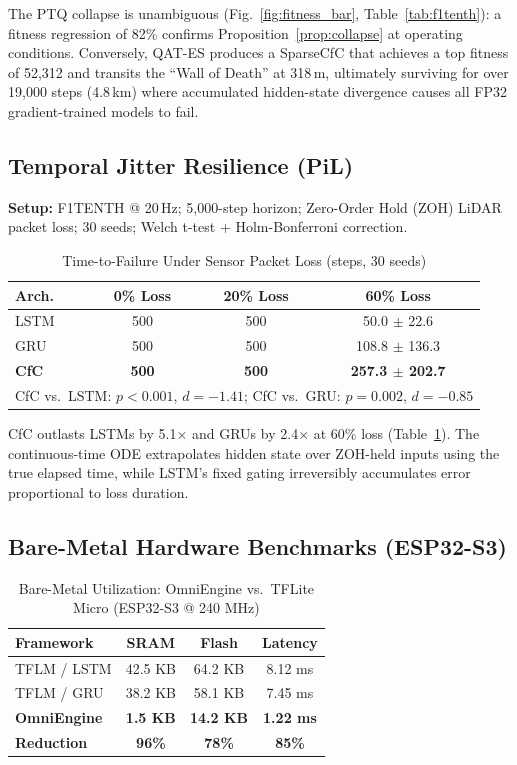 \documentclass[lettersize,journal]{IEEEtran}
\begin{document}
The PTQ collapse is unambiguous (Fig.~\ref{fig:fitness_bar}, Table~\ref{tab:f1tenth}): a fitness regression of 82\% confirms Proposition~\ref{prop:collapse} at operating conditions. Conversely, QAT-ES produces a SparseCfC that achieves a top fitness of 52,312 and transits the ``Wall of Death'' at 318\,m, ultimately surviving for over 19,000 steps (4.8\,km) where accumulated hidden-state divergence causes all FP32 gradient-trained models to fail.

\subsection{Temporal Jitter Resilience (PiL)}
\textbf{Setup:} F1TENTH @ 20\,Hz; 5,000-step horizon; Zero-Order Hold (ZOH) LiDAR packet loss; 30 seeds; Welch t-test + Holm-Bonferroni correction.

\begin{table}[!t]
\caption{Time-to-Failure Under Sensor Packet Loss (steps, 30 seeds)}
\centering
\footnotesize
\begin{tabular}{@{}l c c c@{}}
\toprule
\textbf{Arch.} & \textbf{0\% Loss} & \textbf{20\% Loss} & \textbf{60\% Loss} \\
\midrule
LSTM & 500 & 500 & 50.0 $\pm$ 22.6 \\
GRU  & 500 & 500 & 108.8 $\pm$ 136.3 \\
\textbf{CfC} & \textbf{500} & \textbf{500} & \textbf{257.3 $\pm$ 202.7} \\
\midrule
\multicolumn{4}{l}{\footnotesize CfC vs.\ LSTM: $p{<}0.001$, $d{=}{-}1.41$; CfC vs.\ GRU: $p{=}0.002$, $d{=}{-}0.85$}
\end{tabular}
\label{tab:jitter}
\end{table}

CfC outlasts LSTMs by 5.1$\times$ and GRUs by 2.4$\times$ at 60\% loss (Table~\ref{tab:jitter}). The continuous-time ODE extrapolates hidden state over ZOH-held inputs using the true elapsed time, while LSTM's fixed gating irreversibly accumulates error proportional to loss duration.

\subsection{Bare-Metal Hardware Benchmarks (ESP32-S3)}

\begin{table}[!t]
\caption{Bare-Metal Utilization: OmniEngine vs.\ TFLite Micro (ESP32-S3 @ 240 MHz)}
\centering
\footnotesize
\begin{tabular}{@{}l c c c@{}}
\toprule
\textbf{Framework} & \textbf{SRAM} & \textbf{Flash} & \textbf{Latency} \\
\midrule
TFLM / LSTM  & 42.5 KB & 64.2 KB & 8.12 ms \\
TFLM / GRU   & 38.2 KB & 58.1 KB & 7.45 ms \\
\textbf{OmniEngine} & \textbf{1.5 KB} & \textbf{14.2 KB} & \textbf{1.22 ms} \\
\midrule
\textbf{Reduction} & \textbf{96\%} & \textbf{78\%} & \textbf{85\%} \\
\bottomrule
\end{tabular}
\label{tab:hardware}
\end{table}
\end{document}
